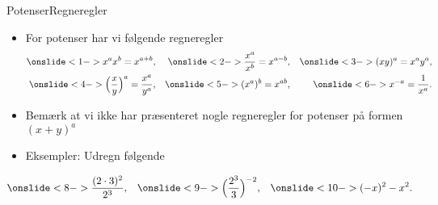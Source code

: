 \begin{frame}{Potenser}{Regneregler}
\begin{itemize}
		\setlength\itemsep{1em}
	\item<1-> For potenser har vi følgende regneregler
	\begin{align*}
	\onslide<1->{x^ax^b=x^{a+b},}&& \onslide<2->{\frac{x^a}{x^b}=x^{a-b},}&&\onslide<3->{(xy)^a=x^ay^a,}\\
	\onslide<4->{\Big(\frac{x}{y}\Big)^a=\frac{x^a}{y^a},}&&\onslide<5->{(x^a)^b=x^{ab},}&& \onslide<6->{x^{-a}=\frac{1}{x^a}.}	\end{align*}
	\item<7-> Bemærk at vi ikke har præsenteret nogle regneregler for potenser på formen $(x+y)^a$
	\item<8-> Eksempler: Udregn følgende
\end{itemize}
\begin{align*}
\onslide<8->{\frac{(2\cdot3)^2}{2^3},}&& \onslide<9->{\Big(\frac{2^3}{3}\Big)^{-2},}&& \onslide<10->{(-x)^2-x^2.}
\end{align*}
\end{frame}


